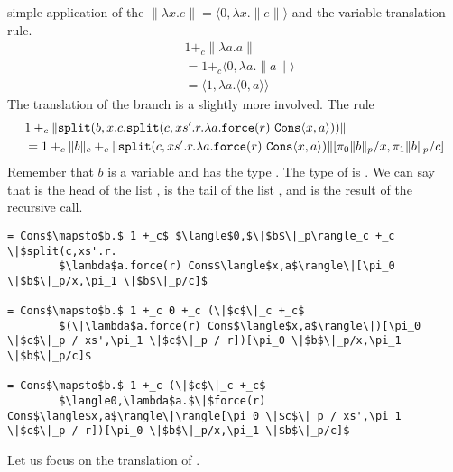 simple application of the $\|\lambda x.e\| = \langle 0, \lambda
x.\|e\|\rangle$ and the variable translation rule.
%
\begin{align*}
  &1 +_c \|\lambda a.a\| \\
  &= 1  +_c   \langle 0, \lambda a. \| a \|\rangle \\
  &=  \langle 1, \lambda a. \langle 0,a \rangle\rangle 
\end{align*}
%
The translation of the  branch is a slightly more involved. The rule 
%
\begin{align*}
  &1 +_c \|\T{split}(b,x.c.\T{split}(c,xs'.r.\lambda a.\T{force}(r)\ \T{Cons} \langle x,a \rangle )) \| \\
  &= 1 +_c \|b\|_c +_c \|\T{split}(c,xs'.r.\lambda a.\T{force}(r)\ \T{Cons}\langle x,a \rangle) \|[\pi_0 \| b \|_p/x,\pi_1 \| b \|_p/c] 
\end{align*}
%
Remember that $b$ is a variable and has the type
.
The type of  is
.
We can say that  is the head of the list ,
 is the tail of the list , and
 is the result of the recursive call.
%
\begin{lstlisting}
= Cons$\mapsto$b.$ 1 +_c$ $\langle$0,$\|$b$\|_p\rangle_c +_c \|$split(c,xs'.r.
        $\lambda$a.force(r) Cons$\langle$x,a$\rangle\|[\pi_0 \|$b$\|_p/x,\pi_1 \|$b$\|_p/c]$

= Cons$\mapsto$b.$ 1 +_c 0 +_c (\|$c$\|_c +_c$
        $(\|\lambda$a.force(r) Cons$\langle$x,a$\rangle\|)[\pi_0 \|$c$\|_p / xs',\pi_1 \|$c$\|_p / r])[\pi_0 \|$b$\|_p/x,\pi_1 \|$b$\|_p/c]$

= Cons$\mapsto$b.$ 1 +_c (\|$c$\|_c +_c$
        $\langle0,\lambda$a.$\|$force(r) Cons$\langle$x,a$\rangle\|\rangle[\pi_0 \|$c$\|_p / xs',\pi_1 \|$c$\|_p / r])[\pi_0 \|$b$\|_p/x,\pi_1 \|$b$\|_p/c]$
\end{lstlisting}
%
Let us focus on the translation of .
